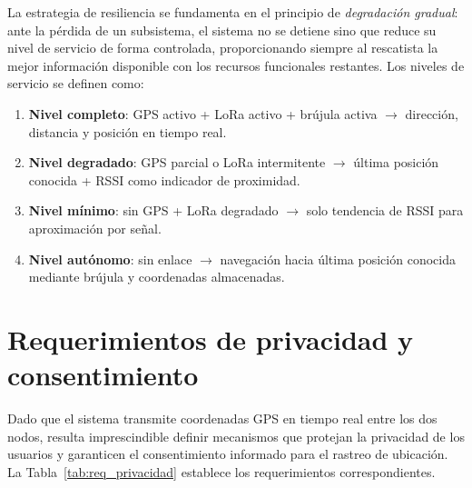 \begin{table}[H]
\begin{center}
{\begin{tabular}{| l | p{3.2cm} | p{5cm} | p{5.5cm} | c |}
\end{tabular}}
\label{tab:req_autonomia}
\end{center}
\end{table}

La estrategia de resiliencia se fundamenta en el principio de \textit{degradación gradual}: ante la pérdida de un subsistema, el sistema no se detiene sino que reduce su nivel de servicio de forma controlada, proporcionando siempre al rescatista la mejor información disponible con los recursos funcionales restantes. Los niveles de servicio se definen como:

\begin{enumerate}
    \item \textbf{Nivel completo}: GPS activo + LoRa activo + brújula activa $\rightarrow$ dirección, distancia y posición en tiempo real.
    \item \textbf{Nivel degradado}: GPS parcial o LoRa intermitente $\rightarrow$ última posición conocida + RSSI como indicador de proximidad.
    \item \textbf{Nivel mínimo}: sin GPS + LoRa degradado $\rightarrow$ solo tendencia de RSSI para aproximación por señal.
    \item \textbf{Nivel autónomo}: sin enlace $\rightarrow$ navegación hacia última posición conocida mediante brújula y coordenadas almacenadas.
\end{enumerate}


\section{Requerimientos de privacidad y consentimiento}\label{sec:privacidad}

Dado que el sistema transmite coordenadas GPS en tiempo real entre los dos nodos, resulta imprescindible definir mecanismos que protejan la privacidad de los usuarios y garanticen el consentimiento informado para el rastreo de ubicación. La Tabla~\ref{tab:req_privacidad} establece los requerimientos correspondientes.

